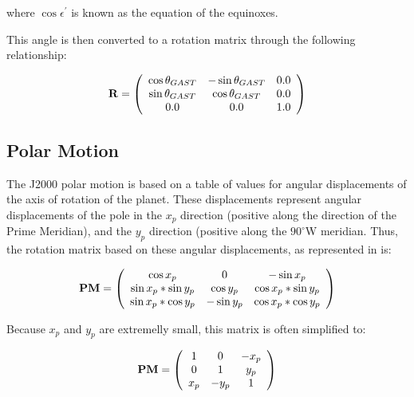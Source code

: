 where $\cos \epsilon^{\prime}$ is known as the equation of the equinoxes.

This angle is then converted to a rotation matrix through the following
relationship:

\begin{equation}\label{rotation_matrix}
{\bf R} =
\left( \begin{array} {ccc}

\cos \theta_{GAST}
& -\sin \theta_{GAST}
& 0.0 \\

\sin \theta_{GAST}
& \cos \theta_{GAST}
& 0.0 \\

0.0
& 0.0
& 1.0

\end{array} \right)
\end{equation}

\subsection{Polar Motion}

The J2000 polar motion is based on a table of values for angular displacements of
the axis of rotation of the planet. These displacements represent angular
displacements of the pole in the $x_p$ direction (positive along the direction
of the Prime Meridian), and the $y_p$
direction (positive along the $90^{\circ}$W
meridian. Thus, the rotation matrix based on these angular displacements,
as represented in \cite{ValladoThird} is:


\begin{equation}\label{true_polar_motion_rot}
{\bf PM} =
 \left( \begin{array} {ccc}
\cos x_p            & 0         & -\sin x_p \\
\sin x_p * \sin y_p & \cos y_p  & \cos x_p * \sin y_p  \\
\sin x_p * \cos y_p & -\sin y_p & \cos x_p * \cos y_p \end{array} \right)
\end{equation}

Because $x_p$ and $y_p$ are extremelly small, this matrix is often simplified to:

\begin{equation}\label{simple_polar_motion_rot}
{\bf PM} =
 \left( \begin{array} {ccc}
1            & 0         & -x_p \\
0 & 1  & y_p  \\
x_p & -y_p & 1 \end{array} \right)
\end{equation}

